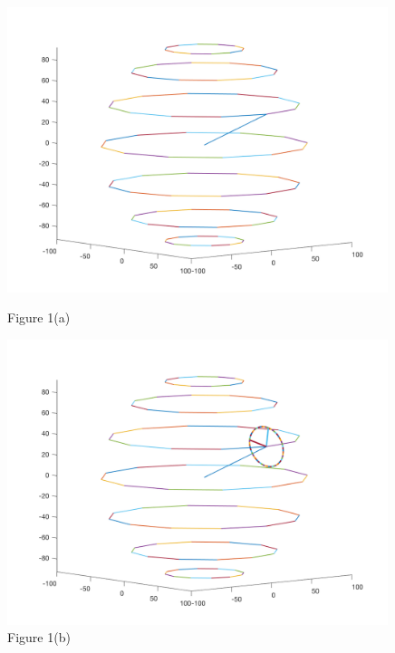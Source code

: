 \documentclass[12pt]{article}
\renewcommand{\(}{\left (}
\renewcommand{\)}{\right )}
\begin{document}
\begin{figure}[ht]
	\begin{minipage}{0.33\textwidth}
		\centering
		\includegraphics[width=0.99\textwidth]{earth_structure.png}
		\caption*{\small Figure 1(a)}
	\end{minipage}
	\begin{minipage}{0.33\textwidth}
		\centering
		\includegraphics[width=0.99\textwidth]{track_structure.png}
		\caption*{\small Figure 1(b)}
	\end{minipage}
	\begin{minipage}{0.33\textwidth}
		\centering

\end{minipage}
\end{figure}
\end{document}
